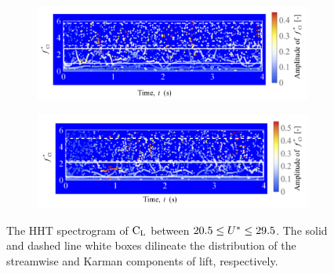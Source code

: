 \documentclass[oneside]{utmthesis}
\begin{document}
\begin{figure} \continuedfloat
  \centering
  \begin{subfigure}[h]{1\textwidth}
    \includegraphics[width=\textwidth]{figs/instantLiftFreq-d}
    \caption{}
    \label{fig:instantLiftFreq-d}
  \end{subfigure}

  \begin{subfigure}[h]{1\textwidth}
    \includegraphics[width=\textwidth]{figs/instantLiftFreq-e}
    \caption{}
    \label{fig:instantLiftFreq-e}
  \end{subfigure}
  \caption{The HHT spectrogram of $\text{C}_{\text{L}}$ between $20.5 \leq U^{*} \leq 29.5$. The solid and dashed line white boxes dilineate the distribution of the streamwise and Karman components of lift, respectively.}
  \label{fig:instantLiftFreq}
\end{figure}
\end{document}
